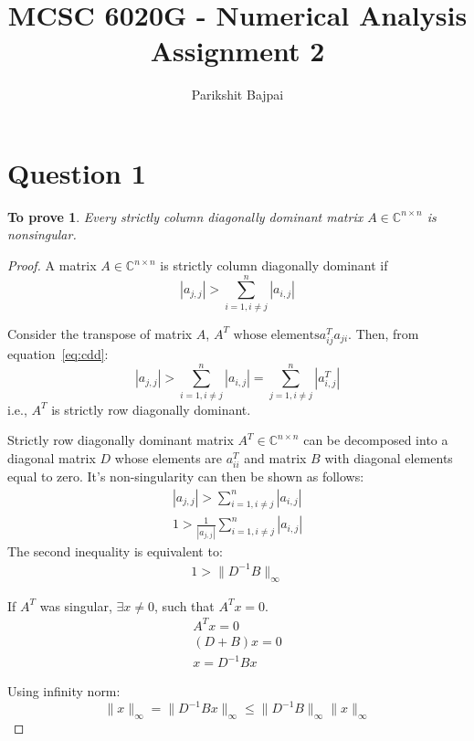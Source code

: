 \documentclass[11pt, oneside]{article}
\title{MCSC 6020G - Numerical Analysis \\
        \Large Assignment 2}
\author{Parikshit Bajpai}
\date{}
\newtheorem*{remark}{To prove}
\begin{document}
\maketitle

\section*{Question 1}
	\begin{remark}
		Every strictly column diagonally dominant matrix $A \in \mathbb{C}^{n \times n}$ is nonsingular. 
	\end{remark}
	\begin{proof}
		A matrix $A \in \mathbb{C}^{n \times n}$ is strictly column diagonally dominant if 
		\begin{equation}\label{eq:cdd}
			|a_{j,j}| > \sum_{i=1, i\neq j}^n |a_{i,j}|
		\end{equation}
		
		Consider the transpose of matrix $A$, $A^T \text{ whose elements} a^T_{ij} a_{ji}$. Then, from equation~\eqref{eq:cdd}:
		\begin{equation}\label{eq:cdd}
			|a_{j,j}| >  \sum_{i=1, i\neq j}^n |a_{i,j}| = \sum_{j=1, i\neq j}^n |a^T_{i,j}|
		\end{equation}
		i.e., $A^T$ is strictly row diagonally dominant.  
		
		Strictly row diagonally dominant matrix $A^T \in \mathbb{C}^{n \times n}$ can be decomposed into a diagonal matrix $D$ whose elements are $a^T_{ii}$ and matrix $B$ with diagonal elements equal to zero. It's non-singularity can then be shown as follows:
		\begin{align}
			|a_{j,j}| > \sum_{i=1, i\neq j}^n |a_{i,j}|\\
			1 > \frac{1}{|a_{j,j}|} \sum_{i=1, i\neq j}^n |a_{i,j}|
		\end{align}
		The second inequality is equivalent to: 
		\begin{align} \label{eq:contra1}
			1 > \|D^{-1} B\|_{\infty}
		\end{align}
		
		If $A^T$ was singular, $\exists x \neq 0$, such that $A^Tx=0$.
		\begin{align}
			A^Tx = 0 \\
			(D + B)x = 0\\
			x = D^{-1} B x
		\end{align}
		
		Using infinity norm:
		\begin{equation}
			\|x\|_{\infty}  =   \|D^{-1} B x \|_{\infty} \leq \|D^{-1} B\|_{\infty} \|x \|_{\infty}
		\end{equation}
		

\end{proof}
\end{document}
